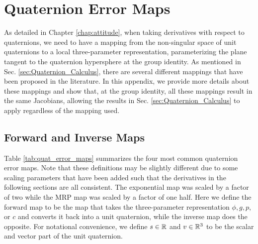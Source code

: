 \documentclass[../root.tex]{subfiles}
\begin{document}
\chapter{Quaternion Error Maps} \label{app:quaternion_error_maps}

As detailed in Chapter \ref{chap:attitude}, when taking derivatives with
respect to quaternions, we need to have a mapping from the non-singular space
of unit quaternions to a local three-parameter representation, parameterizing
the plane tangent to the quaternion hypersphere at the group identity. As
mentioned in Sec. \ref{sec:Quaternion_Calculus}, there are several different
mappings that have been proposed in the literature. In this appendix, we 
provide more details about these mappings and show that, at the group identity,
all these mappings result in the same Jacobians, allowing the results in Sec. 
\ref{sec:Quaternion_Calculus} to apply regardless of the mapping used.

\section{Forward and Inverse Maps} 

Table \ref{tab:quat_error_maps} summarizes the four most common quaternion
error maps. Note that these definitions may be slightly different due to some
scaling parameters that have been added such that the derivatives in the
following sections are all consistent. The exponential map was scaled by a
factor of two while the MRP map was scaled by a factor of one half. Here we
define the forward map to be the map that takes the three-parameter
representation $\phi, g, p$, or $c$ and converts it back into a unit quaternion,
while the inverse map does the opposite. For notational convenience, we
define $s \in \mathbb{R}$ and $v \in \mathbb{R}^3$ to be the scalar and vector part of the
unit quaternion.
\end{document}
